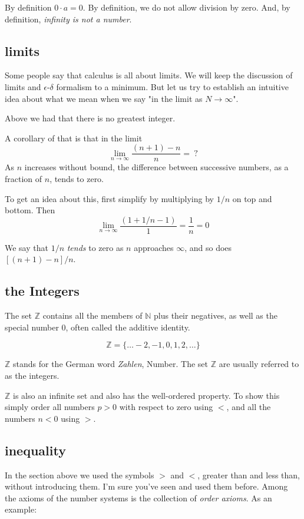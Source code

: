 \documentclass[11pt, oneside]{article}
\begin{document}
By definition $0 \cdot a = 0$.  By definition, we do not allow division by zero.  And, by definition, \emph{infinity is not a number}.

\subsection*{limits}
Some people say that calculus is all about limits.  We will keep the discussion of limits and $\epsilon$-$\delta$ formalism to a minimum.  But let us try to establish an intuitive idea about what we mean when we say "in the limit as $N \rightarrow \infty$".

Above we had that there is no greatest integer.

A corollary of that is that in the limit
\[ \lim_{n \rightarrow \infty} \frac{(n + 1) - n}{n} = \ ? \]
As $n$ increases without bound, the difference between successive numbers, as a fraction of $n$, tends to zero.

To get an idea about this, first simplify by multiplying by $1/n$ on top and bottom.  Then
\[ \lim_{n \rightarrow \infty} \frac{(1 + 1/n - 1)}{1} = \frac{1}{n} = 0 \]

We say that $1/n$ \emph{tends} to zero as $n$ approaches $\infty$, and so does $[(n+1)-n]/n$.

\subsection*{the Integers}

The set $\mathbb{Z}$ contains all the members of $\mathbb{N}$ plus their negatives, as well as the special number $0$, often called the additive identity.

\[ \mathbb{Z} = \{ \dots -2, -1, 0, 1, 2, \dots \} \]

$\mathbb{Z}$ stands for the German word \emph{Zahlen}, Number.  The set $\mathbb{Z}$ are usually referred to as the integers.

$\mathbb{Z}$ is also an infinite set and also has the well-ordered property.  To show this simply order all numbers $p > 0$ with respect to zero using $<$, and all the numbers $n < 0$ using $>$.

\subsection*{inequality}
In the section above we used the symbols $>$ and $<$, greater than and less than, without introducing them.  I'm sure you've seen and used them before.  Among the axioms of the number systems is the collection of \emph{order axioms}.  As an example:
\end{document}
